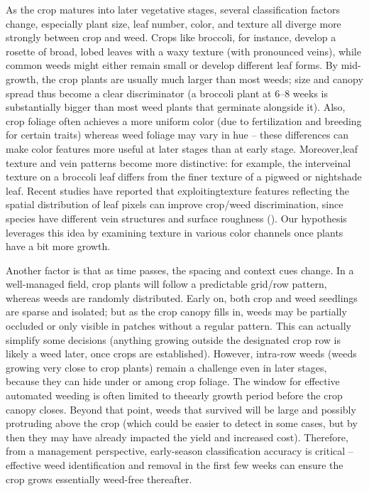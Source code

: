\documentclass[letterpaper, notitlepage]{report}
\begin{document}
As the crop matures into later vegetative stages, several classification factors change, especially plant size, leaf number, color, and texture all diverge more strongly between crop and weed. Crops like broccoli, for instance, develop a rosette of broad, lobed leaves with a waxy texture (with pronounced veins), while common weeds might either remain small or develop different leaf forms. By mid-growth, the crop plants are usually much larger than most weeds; size and canopy spread thus become a clear discriminator (a broccoli plant at 6–8 weeks is substantially bigger than most weed plants that germinate alongside it). Also, crop foliage often achieves a more uniform color (due to fertilization and breeding for certain traits) whereas weed foliage may vary in hue – these differences can make color features more useful at later stages than at early stage. Moreover,leaf texture and vein patterns become more distinctive: for example, the interveinal texture on a broccoli leaf differs from the finer texture of a pigweed or nightshade leaf. Recent studies have reported that exploitingtexture features reflecting the spatial distribution of leaf pixels can improve crop/weed discrimination, since species have different vein structures and surface roughness (\cite{Garibaldi-Marquez2022-yn}). Our hypothesis leverages this idea by examining texture in various color channels once plants have a bit more growth.

Another factor is that as time passes, the spacing and context cues change. In a well-managed field, crop plants will follow a predictable grid/row pattern, whereas weeds are randomly distributed. Early on, both crop and weed seedlings are sparse and isolated; but as the crop canopy fills in, weeds may be partially occluded or only visible in patches without a regular pattern. This can actually simplify some decisions (anything growing outside the designated crop row is likely a weed later, once crops are established). However, intra-row weeds (weeds growing very close to crop plants) remain a challenge even in later stages, because they can hide under or among crop foliage. The window for effective automated weeding is often limited to theearly growth period before the crop canopy closes. Beyond that point, weeds that survived will be large and possibly protruding above the crop (which could be easier to detect in some cases, but by then they may have already impacted the yield and increased cost). Therefore, from a management perspective, early-season classification accuracy is critical – effective weed identification and removal in the first few weeks can ensure the crop grows essentially weed-free thereafter.
\end{document}
